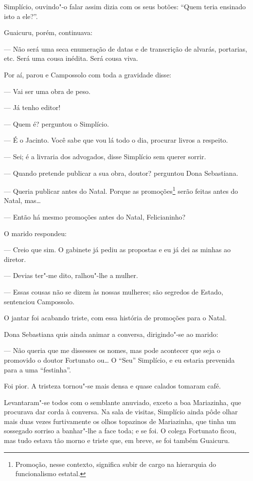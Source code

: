 Simplício, ouvindo"-o falar assim dizia com os seus botões: ``Quem teria
ensinado isto a ele?''.

Guaicuru, porém, continuava:

--- Não será uma seca enumeração de datas e de transcrição de alvarás,
portarias, etc. Será uma cousa inédita. Será cousa viva.

Por aí, parou e Campossolo com toda a gravidade disse:

--- Vai ser uma obra de peso.

--- Já tenho editor!

--- Quem é? perguntou o Simplício.

--- É o Jacinto. Você sabe que vou lá todo o dia, procurar livros a
respeito.

--- Sei; é a livraria dos advogados, disse Simplício sem querer sorrir.

--- Quando pretende publicar a sua obra, doutor? perguntou Dona
Sebastiana.

--- Queria publicar antes do Natal. Porque as promoções\footnote{Promoção,
  nesse contexto, significa subir de cargo na hierarquia do
  funcionalismo estatal.} serão feitas antes do Natal, mas\ldots{}

--- Então há mesmo promoções antes do Natal, Felicianinho?

O marido respondeu:

--- Creio que sim. O gabinete já pediu as propostas e eu já dei as minhas
ao diretor.

--- Devias ter"-me dito, ralhou"-lhe a mulher.

--- Essas cousas não se dizem às nossas mulheres; são segredos de Estado,
sentenciou Campossolo.

O jantar foi acabando triste, com essa história de promoções para o
Natal.

Dona Sebastiana quis ainda animar a conversa, dirigindo"-se ao marido:

--- Não queria que me dissesses os nomes, mas pode acontecer que seja o
promovido o doutor Fortunato ou\ldots{} O ``Seu'' Simplício, e eu
estaria prevenida para a uma ``festinha''.

Foi pior. A tristeza tornou"-se mais densa e quase calados tomaram café.

Levantaram"-se todos com o semblante anuviado, exceto a boa Mariazinha,
que procurava dar corda à conversa. Na sala de visitas, Simplício ainda
pôde olhar mais duas vezes furtivamente os olhos topazinos de
Mariazinha, que tinha um sossegado sorriso a banhar"-lhe a face toda; e
se foi. O colega Fortunato ficou, mas tudo estava tão morno e triste
que, em breve, se foi também Guaicuru.

